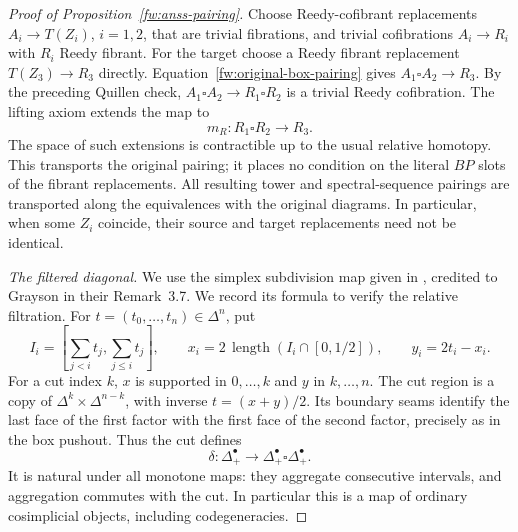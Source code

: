 \begin{proof}[Proof of Proposition~\ref{fw:anss-pairing}]
Choose Reedy-cofibrant replacements $A_i\to T(Z_i)$, $i=1,2$, that
are trivial fibrations, and trivial cofibrations $A_i\to R_i$ with
$R_i$ Reedy fibrant.  For the target choose a Reedy fibrant replacement
$T(Z_3)\to R_3$ directly.  Equation~\eqref{fw:original-box-pairing}
gives $A_1\square A_2\to R_3$.  By the preceding Quillen check,
$A_1\square A_2\to R_1\square R_2$ is a trivial Reedy cofibration.
The lifting axiom extends the map to
\begin{equation}
 m_R:R_1\square R_2\longrightarrow R_3.
 \label{fw:derived-box-pairing}
\end{equation}
The space of such extensions is contractible up to the usual relative
homotopy.  This transports the original pairing; it places no condition
on the literal $BP$ slots of the fibrant replacements.
All resulting tower and spectral-sequence pairings are transported along
the equivalences with the original diagrams.  In particular, when some
$Z_i$ coincide, their source and target replacements need not be identical.

\smallskip\noindent\emph{The filtered diagonal.}
We use the simplex subdivision map given in
\citet[Lemma~3.6]{McClureSmith2004}, credited to Grayson in their
Remark~3.7. We record its formula to verify the relative filtration. For
$t=(t_0,\ldots,t_n)\in\Delta^n$, put
\[
 I_i=\left[\sum_{j<i}t_j,\sum_{j\leq i}t_j\right],\qquad
 x_i=2\,\operatorname{length}(I_i\cap[0,1/2]),\qquad
 y_i=2t_i-x_i.
\]
For a cut index $k$, $x$ is supported in $0,\ldots,k$ and $y$ in
$k,\ldots,n$.  The cut region is a copy of
$\Delta^k\times\Delta^{n-k}$, with inverse $t=(x+y)/2$.
Its boundary seams identify the last face of the first factor with
the first face of the second factor, precisely as in the box pushout.
Thus the cut defines
\[
 \delta:\Delta^\bullet_+\longrightarrow
              \Delta^\bullet_+\square\Delta^\bullet_+.
\]
It is natural under all monotone maps: they aggregate consecutive
intervals, and aggregation commutes with the cut.  In particular this
is a map of ordinary cosimplicial objects, including codegeneracies.


\end{proof}
